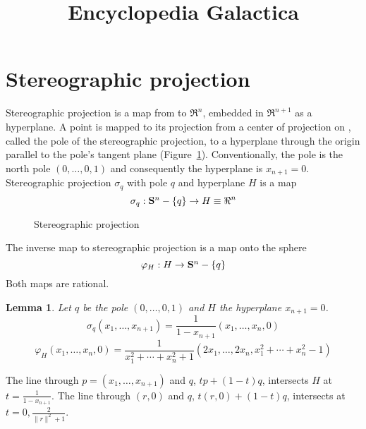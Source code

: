 \newtheorem{rmk}{Remark}[section]
\newtheorem{example}{Example}[section]
\newtheorem{conjecture}{Conjecture}[section]
\newtheorem{claim}{Claim}[section]
\newtheorem{notation}{Notation}[section]
\newtheorem{theorem}{Theorem}[section]
\newtheorem{lemma}[theorem]{Lemma}
\newtheorem{corollary}[theorem]{Corollary}
\newtheorem{defn2}{Definition}[section]

\DoubleSpace

\setlength{\oddsidemargin}{0pt}
\setlength{\topmargin}{-.25in}	%
\setlength{\headsep}{0pt}
\setlength{\textheight}{8.75in}
\setlength{\textwidth}{6.5in}
\setlength{\columnsep}{5mm}		%


\title{Encyclopedia Galactica}


\maketitle

\section{Stereographic projection}

Stereographic projection is a map from  to $\Re^n$,
embedded in $\Re^{n+1}$ as a hyperplane.
A point is mapped to its projection from
a center of projection on , called the pole of the stereographic projection,
to a hyperplane through the origin parallel to the pole's tangent plane (Figure~\ref{fig:stereo}).
Conventionally, the pole is the north pole $(0,\ldots,0,1)$
and consequently the hyperplane is $x_{n+1}=0$.
Stereographic projection $\sigma_q$ with pole $q$ and hyperplane $H$ is
a map
\[	\sigma_q : \mbox{{\bf S}$^{n}$} - \{ q \} \rightarrow H \equiv \Re^n	\]

\begin{figure}
\vspace{2in}
\caption{Stereographic projection}
\label{fig:stereo}
\end{figure}

The inverse map to stereographic projection is a map onto the sphere
\[	\varphi_H : H \rightarrow \mbox{{\bf S}$^{n}$} - \{ q \}	\]
Both maps are rational.

\begin{lemma}
Let $q$ be the pole $(0,\ldots,0,1)$ and $H$ the hyperplane $x_{n+1}=0$.
\[
	\sigma_q (x_1,\ldots,x_{n+1}) = 
	\frac{1}{1-x_{n+1}} (x_1, \ldots, x_n, 0)
\]
\[
	\varphi_H (x_1,\ldots,x_n,0) = 
	\frac{1}{x_1^2 + \cdots + x_n^2 + 1} 
	(2x_1, \ldots, 2x_n, x_1^2 + \cdots + x_n^2 - 1)
\]	%
\end{lemma}
\prf
The line through $p = (x_1,\ldots,x_{n+1})$ and $q$, $tp + (1-t)q$,
intersects $H$ at $t = \frac{1}{1 - x_{n+1}}$.
The line through $(r,0)$ and $q$, $t(r,0) + (1-t)q$,
intersects  at $t=0,\frac{2}{\|r\|^2 + 1}$.
\QED

